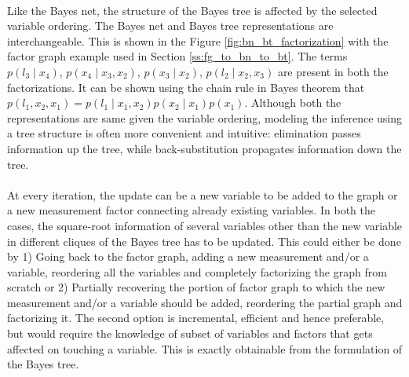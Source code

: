 \paragraph{}
Like the Bayes net, the structure of the Bayes tree is affected by the selected variable ordering. The Bayes net and Bayes tree representations are interchangeable. This is shown in the Figure \ref{fig:bn_bt_factorization} with the factor graph example used in Section \ref{ss:fg_to_bn_to_bt}. The terms $p(l_3\mid x_4)$, $p(x_4 \mid x_3, x_2)$, $p(x_3 \mid x_2)$, $p(l_2 \mid x_2, x_3)$ are present in both the factorizations. It can be shown using the chain rule in Bayes theorem that $p(l_1, x_2, x_1) = p(l_1 \mid x_1,x_2)p(x_2\mid x_1)p(x_1)$. Although both the representations are same given the variable ordering, modeling the inference using a tree structure is often more convenient and intuitive: elimination passes information up the tree, while back-substitution propagates information down the tree.
\paragraph{}
At every iteration, the update can be a new variable to be added to the graph or a new measurement factor connecting already existing variables. In both the cases, the square-root information of several variables other than the new variable in different cliques of the Bayes tree has to be updated. This could either be done by 1) Going back to the factor graph, adding a new measurement and/or a variable, reordering all the variables and completely factorizing the graph from scratch or 2) Partially recovering the portion of factor graph to which the new measurement and/or a variable should be added, reordering the partial graph and factorizing it. The second option is incremental, efficient and hence preferable, but would require the knowledge of subset of variables and factors that gets affected on touching a variable. This is exactly obtainable from the formulation of the Bayes tree.
